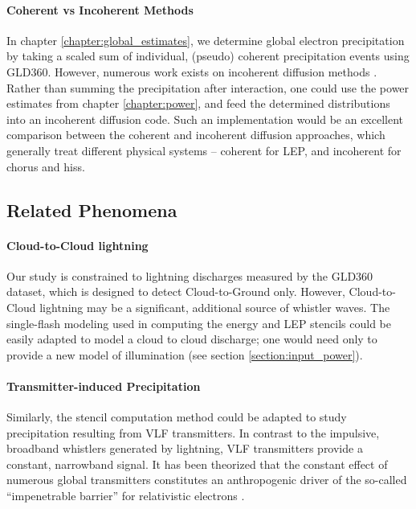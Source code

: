 \paragraph{Coherent vs Incoherent Methods}
In chapter \ref{chapter:global_estimates}, we determine global electron precipitation by taking a scaled sum of individual, (pseudo) coherent precipitation events using GLD360. However, numerous work exists on incoherent diffusion methods \citep{Kennel1966, Lyons1973, Glauert2005}. Rather than summing the precipitation after interaction, one could use the power estimates from chapter \ref{chapter:power}, and feed the determined distributions into an incoherent diffusion code. Such an implementation would be an excellent comparison between the coherent and incoherent diffusion approaches, which generally treat different physical systems -- coherent for LEP, and incoherent for chorus and hiss.

\subsection{Related Phenomena}
\paragraph{Cloud-to-Cloud lightning}
Our study is constrained to lightning discharges measured by the GLD360 dataset, which is designed to detect Cloud-to-Ground only. However, Cloud-to-Cloud lightning may be a significant, additional source of whistler waves. The single-flash modeling used in computing the energy and LEP stencils could be easily adapted to model a cloud to cloud discharge; one would need only to provide a new model of illumination (see section \ref{section:input_power}). 
\paragraph{Transmitter-induced Precipitation}
Similarly, the stencil computation method could be adapted to study precipitation resulting from VLF transmitters. In contrast to the impulsive, broadband whistlers generated by lightning, VLF transmitters provide a constant, narrowband signal. It has been theorized that the constant effect of numerous global transmitters constitutes an anthropogenic driver of the so-called ``impenetrable barrier'' for relativistic electrons \citep{Baker2014, VLF_BUBBLE}.



